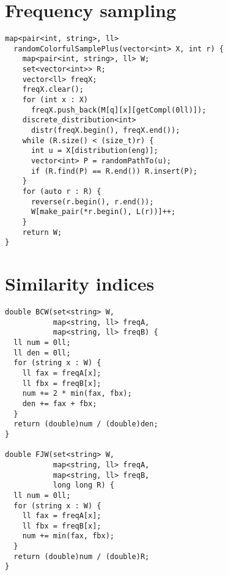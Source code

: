 \clearpage
\section*{Frequency sampling}

\begin{lstlisting}
map<pair<int, string>, ll> 
  randomColorfulSamplePlus(vector<int> X, int r) {
    map<pair<int, string>, ll> W;
    set<vector<int>> R;
    vector<ll> freqX;
    freqX.clear();
    for (int x : X) 
      freqX.push_back(M[q][x][getCompl(0ll)]);
    discrete_distribution<int> 
      distr(freqX.begin(), freqX.end());
    while (R.size() < (size_t)r) {
      int u = X[distribution(eng)];
      vector<int> P = randomPathTo(u);
      if (R.find(P) == R.end()) R.insert(P);
    }
    for (auto r : R) {
      reverse(r.begin(), r.end());
      W[make_pair(*r.begin(), L(r))]++;
    }
    return W;
}
\end{lstlisting}

\clearpage
\section*{Similarity indices}

\begin{lstlisting}
double BCW(set<string> W, 
           map<string, ll> freqA, 
           map<string, ll> freqB) {
  ll num = 0ll;
  ll den = 0ll;
  for (string x : W) {
    ll fax = freqA[x];
    ll fbx = freqB[x];
    num += 2 * min(fax, fbx);
    den += fax + fbx;
  }
  return (double)num / (double)den;
}

double FJW(set<string> W,
           map<string, ll> freqA, 
           map<string, ll> freqB,
           long long R) {
  ll num = 0ll;
  for (string x : W) {
    ll fax = freqA[x];
    ll fbx = freqB[x];
    num += min(fax, fbx);
  }
  return (double)num / (double)R;
}
\end{lstlisting}


